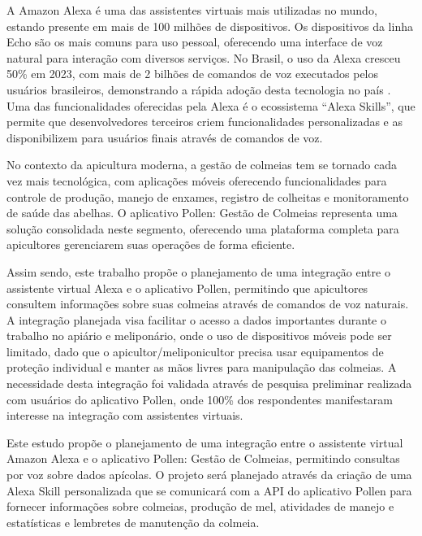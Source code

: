 \label{cap:introducao}

A Amazon Alexa é uma das assistentes virtuais mais utilizadas no mundo, estando presente em mais de 100 milhões de dispositivos. 
Os dispositivos da linha Echo são os mais comuns para uso pessoal, oferecendo uma interface de voz natural para interação com diversos serviços. 
No Brasil, o uso da Alexa cresceu 50\% em 2023, com mais de 2 bilhões de comandos de voz executados pelos usuários brasileiros, 
demonstrando a rápida adoção desta tecnologia no país \cite{forbes2024}. Uma das funcionalidades oferecidas pela Alexa é o ecossistema ``Alexa Skills'', 
que permite que desenvolvedores terceiros criem funcionalidades personalizadas e as disponibilizem para usuários finais através de comandos de voz.

No contexto da apicultura moderna, a gestão de colmeias tem se tornado cada vez mais tecnológica, com aplicações móveis oferecendo funcionalidades 
para controle de produção, manejo de enxames, registro de colheitas e monitoramento de saúde das abelhas. 
O aplicativo Pollen: Gestão de Colmeias representa uma solução consolidada neste segmento, oferecendo uma plataforma completa para apicultores 
gerenciarem suas operações de forma eficiente.

Assim sendo, este trabalho propõe o planejamento de uma integração entre o assistente virtual Alexa e o aplicativo Pollen, 
permitindo que apicultores consultem informações sobre suas colmeias através de comandos de voz naturais. 
A integração planejada visa facilitar o acesso a dados importantes durante o trabalho no apiário e meliponário, onde o uso de dispositivos móveis pode ser limitado, dado que o apicultor/meliponicultor precisa usar equipamentos de proteção individual e manter as mãos livres para manipulação das colmeias.
A necessidade desta integração foi validada através de pesquisa preliminar realizada com usuários do aplicativo Pollen, onde 100\% dos respondentes manifestaram interesse na integração com assistentes virtuais.


\label{sec:delimitacao-tema-pesquisa}

Este estudo propõe o planejamento de uma integração entre o assistente virtual Amazon Alexa e o aplicativo Pollen: Gestão de Colmeias, 
permitindo consultas por voz sobre dados apícolas. O projeto será planejado através da criação de uma Alexa Skill personalizada 
que se comunicará com a API do aplicativo Pollen para fornecer informações sobre colmeias, produção de mel, atividades de manejo e estatísticas e lembretes de manutenção da colmeia.

